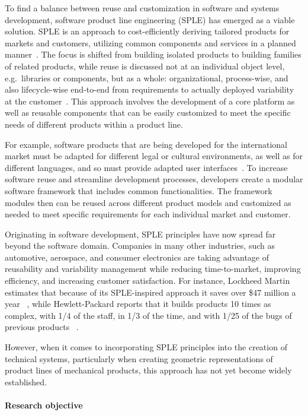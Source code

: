 \documentclass[sigconf,review,anonymous]{acmart}
\begin{document}
To find a balance between reuse and customization in software and systems development, software product line engineering (SPLE) has emerged as a viable solution. 
SPLE is an approach to cost-efficiently deriving tailored products for markets and customers, utilizing common components and services in a planned manner~\cite{Runeson_2012}.
The focus is shifted from building isolated products to building families of related products, while reuse is discussed not at an individual object level, e.g.~libraries or components, but as a whole: organizational, process-wise, and also lifecycle-wise end-to-end from requirements to actually deployed variability at the customer~\cite{Schwanninger_2009}. 
This approach involves the development of a core platform as well as reusable components that can be easily customized to meet the specific needs of different products within a product line. 

For example, software products that are being developed for the international market must be adapted for different legal or cultural environments, as well as for different languages, and so must provide adapted user interfaces~\cite{Beuche_2007}. 
To increase software reuse and streamline development processes, developers create a modular software framework that includes common functionalities. 
The framework modules then can be reused across different product models and customized as needed to meet specific requirements for each individual market and customer.

Originating in software development, SPLE principles have now spread far beyond the software domain. 
Companies in many other industries, such as automotive, aerospace, and consumer electronics are taking advantage of reusability and variability management while reducing time-to-market, improving efficiency, and increasing customer satisfaction. 
For instance, Lockheed Martin estimates that because of its SPLE-inspired approach it saves over \$47 million a year ~\cite{Gregg_2015}, while Hewlett-Packard reports that it builds products 10 times as complex, with 1/4 of the staff, in 1/3 of the time, and with 1/25 of the bugs of previous products ~\cite{Mebane_2007}.

However, when it comes to incorporating SPLE principles into the creation of technical systems, particularly when creating geometric representations of product lines of mechanical products, this approach has not yet become widely established. 

\paragraph{Research objective}
\end{document}
